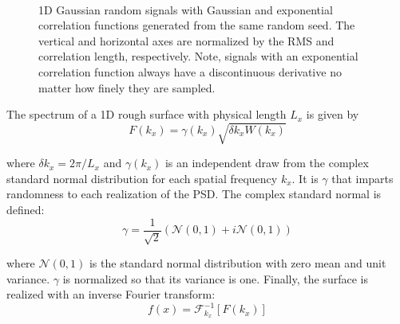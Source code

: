  \begin{figure}[t] 
   \centering
    \\
    \caption{1D Gaussian random signals with Gaussian and exponential correlation functions generated from the same random seed. The vertical and horizontal axes are normalized by the RMS and correlation length, respectively. Note, signals with an exponential correlation function always have a discontinuous derivative no matter how finely they are sampled.}
\end{figure}



The spectrum of a 1D rough surface with physical length $L_x$ is given by
\begin{equation}
F(k_x) = \gamma(k_x)\sqrt{\delta k_x W(k_x)}
\end{equation}

\noindent where $\delta k_x = 2 \pi/ L_x$ and $\gamma(k_x)$ is an independent draw from the complex standard normal distribution for each spatial frequency $k_x$.  It is $\gamma$ that imparts randomness to each realization of the PSD.  The complex standard normal is defined:
\begin{equation}
\gamma = \dfrac{1}{\sqrt{2}}\left( \mathcal{N}(0,1) + i \mathcal{N}(0,1)\right)
\end{equation}

\noindent where $\mathcal{N}(0,1)$ is the standard normal distribution with zero mean and unit variance. $\gamma$ is normalized so that its variance is one.  Finally, the surface is realized with an inverse Fourier transform:
\begin{equation}
f(x) = \mathcal{F}_{k_x}^{-1}\left[F(k_x)\right]
\end{equation}

